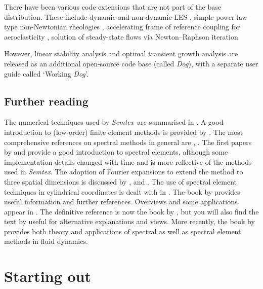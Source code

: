 \documentclass[11pt]{report}
\newcommand{\Semtex}{\emph{Semtex}} \newcommand{\Dog}{\emph{Dog}}
\begin{document}
There have been various code extensions that are not part of the base
distribution. These include dynamic and non-dynamic LES
\citep{blsc03}, simple power-law type non-Newtonian rheologies
\citep{rb06}, accelerating frame of reference coupling for
aeroelasticity \citep{bh96a,bh99,bgw01,hmb03}, solution of
steady-state flows via Newton--Raphson iteration \citep{hmb02a}

However, linear stability analysis
\citep{hmb02a,bllo03b,bllo03a,bml05,shbl05,ebs06,blsh07} and optimal
transient growth analysis \citep{bbs08a} are released as an additional
open-source code base (called \Dog), with a separate user guide
called `Working \Dog'.

\section{Further reading}

The numerical techniques used by \Semtex\ are summarised in
\citet{blas19}.  A good introduction to (low-order) finite element
methods is provided by \citet{hughes87}.  The most comprehensive
references on spectral methods in general are \citet{gs77},
\citet{chqz88,chqz06}.  The first papers by \citet{pat84} and
\citet{kp86} provide a good introduction to spectral elements,
although some implementation details changed with time and
\citet{mt89} is more reflective of the methods used in \Semtex.  The
adoption of Fourier expansions to extend the method to three spatial
dimensions is discussed by \citet{ap89}, \citet{kar89} and
\citet{kar90}.  The use of spectral element techniques in cylindrical
coordinates is dealt with in \citet{blsh04}.  The book by
\citet{fun97} provides useful information and further references.
Overviews and some applications appear in \citet{kh98,hen99b}.  The
definitive reference is now the book by \citet{kars05}, but you will
also find the text by \citet*{dfm02} useful for alternative
explanations and views. More recently, the book by \citet{chqz07}
provides both theory and applications of spectral as well as spectral
element methods in fluid dynamics.

\chapter{Starting out}
\label{ch.start}

\end{document}
